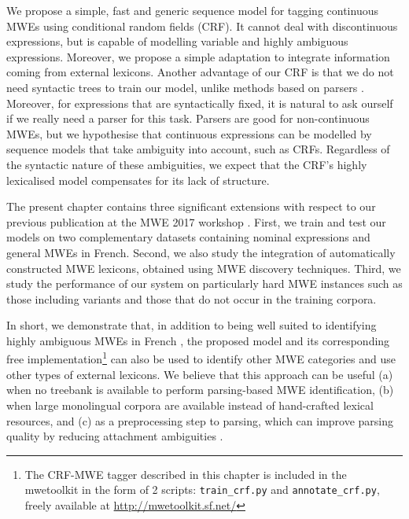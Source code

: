 \documentclass[output=paper,
modfonts
]{langscibook}
\begin{document}
We propose a simple, fast and generic sequence model for tagging continuous MWEs using conditional random fields (CRF). 
It cannot deal with discontinuous expressions, but is capable of modelling variable and highly ambiguous expressions. 
Moreover, we propose a simple adaptation to integrate information coming from external lexicons. 
Another advantage of our CRF is that we do not need syntactic trees to train our model, unlike methods based on parsers \citep{leroux:hal-01074298,nasr:acl:2015,constant-nivre:acl:2016}. 
Moreover, for expressions that are syntactically fixed, it is natural to ask ourself if we really need a parser for this task. 
Parsers are good for non-continuous MWEs, but we hypothesise that continuous expressions can be modelled by sequence models that take ambiguity into account, such as CRFs. 
Regardless of the syntactic nature of these ambiguities, we expect that the CRF's highly lexicalised model compensates for its lack of structure.

The present chapter contains three significant extensions with respect to our previous publication at the MWE 2017 workshop \citep{scholivet-ramisch:2017:MWE2017}. 
First, we train and test our models on two complementary datasets containing nominal expressions and general MWEs in French. 
Second, we also study the integration of automatically constructed MWE lexicons, obtained using MWE discovery techniques.
Third, we study the performance of our system on particularly hard MWE instances such as those including variants and those that do not occur in the training corpora.

In short, we demonstrate that, in addition to being well suited to identifying highly ambiguous MWEs in French \citep{scholivet-ramisch:2017:MWE2017}, the proposed model and its corresponding free implementation\footnote{The CRF-MWE tagger described in this chapter is included in the mwetoolkit in the form of 2 scripts: \texttt{train\_crf.py} and \texttt{annotate\_crf.py}, freely available at \url{http://mwetoolkit.sf.net/} } can also be used to identify other MWE categories and use other types of external lexicons.
We believe that this approach can be useful (a) when no treebank is available to perform parsing-based MWE identification, (b) when large monolingual corpora are available instead of hand-crafted lexical resources, and (c) as a preprocessing step to parsing, which can improve parsing quality by reducing attachment ambiguities \citep{candito-constant:acl:2014,nivre2004}.
\end{document}
